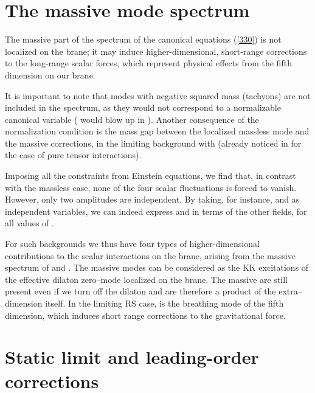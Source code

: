 \documentclass[a4paper,12pt]{article}
\begin{document}
\section{The massive mode spectrum}

The massive part of the spectrum of the canonical equations
(\ref{330}) is not localized on the brane; it may induce
higher-dimensional, short-range corrections to the long-range
scalar forces, which represent physical effects from
the fifth dimension on our brane.

It is important to note that modes with negative squared mass
(tachyons) are not included in the spectrum, as they would not
correspond to a normalizable canonical variable (\myHighlight{$\Psi$}\coordHE{} would blow
up in \coordHE{}). Another consequence of the normalization condition is
the mass gap between the localized massless mode and the massive
corrections, in the limiting background with \coordHE{} (already
noticed in \cite{CLP} for the case of pure tensor interactions).

Imposing all the constraints from Einstein equations, we find
that, in contrast with the massless case, none of the four scalar
fluctuations is forced to vanish. However, only two amplitudes are
independent. By taking, for instance, \coordHE{} and \coordHE{} as
independent variables, we can indeed express \coordHE{} and \coordHE{} in
terms of the other fields, for all values of \myHighlight{$\Delta$}\coordHE{}.

For such backgrounds we  thus have four types of
higher-dimensional contributions to the scalar interactions on the
brane, arising from the massive spectrum of \coordHE{} and \coordHE{}.
The massive \coordHE{} modes can be considered as the KK
excitations of the effective dilaton zero--mode localized on the
brane. The massive \coordHE{} are still present even if we turn
off the dilaton and are therefore a product of the
extra--dimension itself. In the limiting RS case, \myHighlight{$\omega_3\equiv
\Gamma$}\coordHE{} is the breathing mode of the fifth dimension, which
induces short range corrections to the gravitational force.

\section{Static limit and leading-order corrections}
\end{document}
